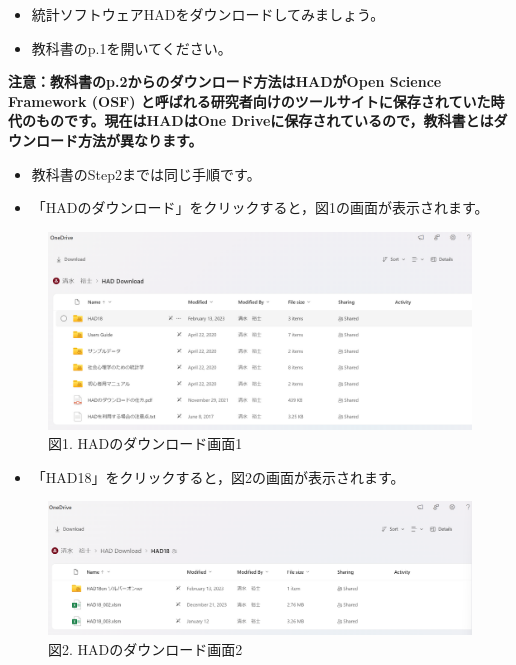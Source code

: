 \documentclass[
]{book}
\providecommand{\tightlist}{%
  \setlength{\itemsep}{0pt}\setlength{\parskip}{0pt}}
\theoremstyle{definition}
\theoremstyle{definition}
\theoremstyle{definition}
\theoremstyle{definition}
\theoremstyle{remark}
\begin{document}
\begin{itemize}
\tightlist
\item
  統計ソフトウェアHADをダウンロードしてみましょう。\\
\item
  教科書のp.1を開いてください。
\end{itemize}

\textbf{注意：教科書のp.2からのダウンロード方法はHADがOpen Science Framework (OSF) と呼ばれる研究者向けのツールサイトに保存されていた時代のものです。現在はHADはOne Driveに保存されているので，教科書とはダウンロード方法が異なります。}

\begin{itemize}
\tightlist
\item
  教科書のStep2までは同じ手順です。
\item
  「HADのダウンロード」をクリックすると，図1の画面が表示されます。
\end{itemize}

\begin{figure}
\centering
\includegraphics{images/1.1_HADのダウンロード1.png}
\caption{図1. HADのダウンロード画面1}
\end{figure}

\begin{itemize}
\tightlist
\item
  「HAD18」をクリックすると，図2の画面が表示されます。
\end{itemize}

\begin{figure}
\centering
\includegraphics{images/1.1_HADのダウンロード2.png}
\caption{図2. HADのダウンロード画面2}
\end{figure}
\end{document}
